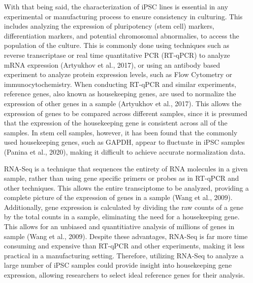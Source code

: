 \documentclass[
  letterpaper,
  DIV=11,
  numbers=noendperiod]{scrartcl}
\begin{document}
With that being said, the characterization of iPSC lines is essential in
any experimental or manufacturing process to ensure consistency in
culturing. This includes analyzing the expression of pluripotency (stem
cell) markers, differentiation markers, and potential chromosomal
abnormalies, to access the population of the culture. This is commonly
done using techniques such as reverse transcriptase or real time
quantitative PCR (RT-qPCR) to analyze mRNA expression (Artyukhov et al.,
2017), or using an antibody based experiment to analyze protein
expression levels, such as Flow Cytometry or immunocytochemistry. When
conducting RT-qPCR and similar experiments, reference genes, also known
as housekeeping genes, are used to normalize the expression of other
genes in a sample (Artyukhov et al., 2017). This allows the expression
of genes to be compared across different samples, since it is presumed
that the expression of the housekeeping gene is consistent across all of
the samples. In stem cell samples, however, it has been found that the
commonly used housekeeping genes, such as GAPDH, appear to fluctuate in
iPSC samples (Panina et al., 2020), making it difficult to achieve
accurate normalization data.

RNA-Seq is a technique that sequences the entirety of RNA molecules in a
given sample, rather than using gene specific primers or probes as in
RT-qPCR and other techniques. This allows the entire transciptome to be
analyzed, providing a complete picture of the expression of genes in a
sample (Wang et al., 2009). Additionally, gene expression is calculated
by dividing the raw counts of a gene by the total counts in a sample,
eliminating the need for a housekeeping gene. This allows for an
unbiased and quantitiative analysis of millions of genes in sample (Wang
et al., 2009). Despite these advantages, RNA-Seq is far more time
consuming and expensive than RT-qPCR and other experiments, making it
less practical in a manufacturing setting. Therefore, utilizing RNA-Seq
to analyze a large number of iPSC samples could provide insight into
housekeeping gene expression, allowing researchers to select ideal
reference genes for their analysis.
\end{document}
